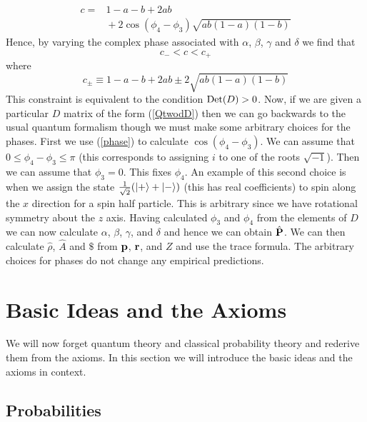 \documentclass[10pt,twocolumn]{article}
\begin{document}
\begin{equation}\label{phase}
\begin{array}{ll}
\!\!c= & \!\!\!\!\!1-a-b+2ab \\[1pt]
\!\!                & \!\!\!\!\!
+2 \cos(\phi_4-\phi_3) \sqrt{ab(1-a)(1-b)}
\end{array}
\end{equation}
Hence, by varying the complex phase associated with $\alpha$, $\beta$, $\gamma$
and $\delta$ we find that
\begin{equation}\label{cpccm}
c_-< c < c_+
\end{equation}
where
\begin{equation}\label{Qroots}
c_{\pm}\equiv 1-a-b+2ab \pm 2\sqrt{ab(1-a)(1-b)}
\end{equation}
This constraint is equivalent to the condition ${\rm Det}(D) > 0$.
Now, if we are given a particular $D$ matrix of the form (\ref{QtwodD})
then we can go backwards to the usual quantum formalism though we must
make some arbitrary choices for the phases.
First we use (\ref{phase}) to calculate $\cos(\phi_4-\phi_3)$.  We can
assume that $0\leq \phi_4-\phi_3 \leq \pi$ (this corresponds to
assigning $i$ to one of the roots $\sqrt{-1}$).  Then we can assume
that $\phi_3=0$.  This fixes $\phi_4$.  An example of this second choice
is when we assign the state ${1\over\sqrt{2}}(|+\rangle+|-\rangle)$
(this has real coefficients) to spin along the $x$ direction for a spin
half particle.  This is arbitrary since we have rotational symmetry about
the $z$ axis.  Having calculated $\phi_3$ and $\phi_4$ from the elements
of $D$ we can now calculate $\alpha$, $\beta$, $\gamma$, and $\delta$
and hence we can obtain $\hat{\bf P}$. We can then
calculate $\hat{\rho}$,
$\hat{A}$ and $ \$ $ from ${\bf p}$, ${\bf r}$, and $Z$ and use the
trace formula.  The arbitrary choices for phases do not change any
empirical predictions.






\section{Basic Ideas and the Axioms}

We will now forget quantum theory and classical probability theory and
rederive them from the axioms.  In this section we will introduce the
basic ideas and the axioms in context.

\subsection{Probabilities}
\end{document}
